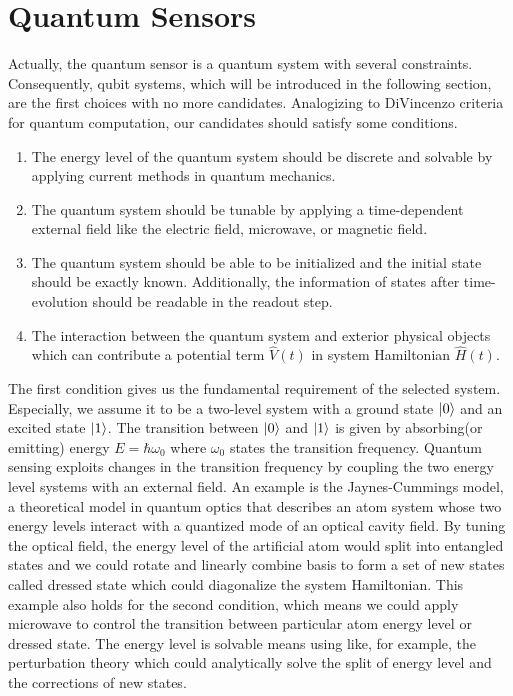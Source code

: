 \documentclass[11pt]{article}
\begin{document}
\section{Quantum Sensors}
Actually, the quantum sensor is a quantum system with several constraints. Consequently, qubit systems, which will be introduced in the following section, are the first choices with no more candidates. Analogizing to DiVincenzo criteria for quantum computation, our candidates should satisfy some conditions.
	\begin{enumerate}
		\item The energy level of the quantum system should be discrete and solvable by applying current methods in quantum mechanics.
		\item The quantum system should be tunable by applying a time-dependent external field like the electric field, microwave, or magnetic field.
		\item The quantum system should be able to be initialized and the initial state should be exactly known. Additionally, the information of states after time-evolution should be readable in the readout step.
		\item The interaction between the quantum system and exterior physical objects which can contribute a  potential term $\hat{V}(t)$ in system Hamiltonian $\hat{H}(t)$. 
	\end{enumerate}
The first condition gives us the fundamental requirement of the selected system. Especially, we assume it to be a two-level system with a ground state $\ket{0}$ and an excited state $\ket{1}$. The transition between $\ket{0}$ and $\ket{1}$ is given by absorbing(or emitting) energy $E = \hbar \omega_0$ where $\omega_0 $ states the transition frequency. Quantum sensing exploits changes in the transition frequency by coupling the two energy level systems with an external field. An example is the Jaynes-Cummings model, a theoretical model in quantum optics that describes an atom system whose two energy levels interact with a quantized mode of an optical cavity field. By tuning the optical field, the energy level of the artificial atom would split into entangled states and we could rotate and linearly combine basis to form a set of new states called dressed state which could diagonalize the system Hamiltonian. This example also holds for the second condition, which means we could apply microwave to control the transition between particular atom energy level or dressed state. The energy level is solvable means using like, for example, the perturbation theory which could analytically solve the split of energy level and the corrections of new states. 
\end{document}
